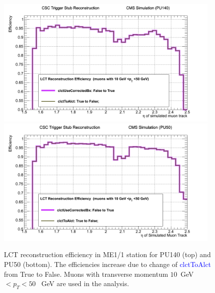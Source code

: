 \begin{figure}[h!]
\includegraphics[width=0.98\textwidth]{figures/PU140_Improv_from5_to_6.png}
\includegraphics[width=0.98\textwidth]{figures/PU50_Improv_from5_to_6.png}
\caption{LCT reconstruction efficiency in ME1/1 station for PU140 (top) and PU50 (bottom). The efficiencies increase due to change of \textcolor{blue}{clctToAlct} from True to False. Muons with transverse momentum $10$~GeV$<p_T<50$~ GeV are used in the analysis.}
\label{fig:From5to6}
\end{figure}
